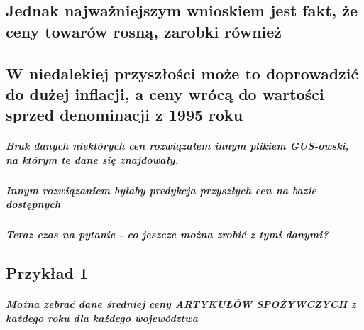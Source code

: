 \documentclass[11pt]{article}
\begin{document}
    \hypertarget{jednak-najwaux17cniejszym-wnioskiem-jest-fakt-ux17ce-ceny-towaruxf3w-rosnux105-zarobki-ruxf3wnieux17c}{%
\subsection{Jednak najważniejszym wnioskiem jest fakt, że ceny towarów
rosną, zarobki
również}\label{jednak-najwaux17cniejszym-wnioskiem-jest-fakt-ux17ce-ceny-towaruxf3w-rosnux105-zarobki-ruxf3wnieux17c}}

\hypertarget{w-niedalekiej-przyszux142oux15bci-moux17ce-to-doprowadziux107-do-duux17cej-inflacji-a-ceny-wruxf3cux105-do-wartoux15bci-sprzed-denominacji-z-1995-roku}{%
\subsection{W niedalekiej przyszłości może to doprowadzić do dużej
inflacji, a ceny wrócą do wartości sprzed denominacji z 1995
roku}\label{w-niedalekiej-przyszux142oux15bci-moux17ce-to-doprowadziux107-do-duux17cej-inflacji-a-ceny-wruxf3cux105-do-wartoux15bci-sprzed-denominacji-z-1995-roku}}

    \hypertarget{brak-danych-niektuxf3rych-cen-rozwiux105zaux142em-innym-plikiem-gus-owski-na-ktuxf3rym-te-dane-siux119-znajdowaux142y.}{%
\subparagraph{Brak danych niektórych cen rozwiązałem innym plikiem
GUS-owski, na którym te dane się
znajdowały.}\label{brak-danych-niektuxf3rych-cen-rozwiux105zaux142em-innym-plikiem-gus-owski-na-ktuxf3rym-te-dane-siux119-znajdowaux142y.}}

\hypertarget{innym-rozwiux105zaniem-byux142aby-predykcja-przyszux142ych-cen-na-bazie-dostux119pnych}{%
\subparagraph{Innym rozwiązaniem byłaby predykcja przyszłych cen na
bazie
dostępnych}\label{innym-rozwiux105zaniem-byux142aby-predykcja-przyszux142ych-cen-na-bazie-dostux119pnych}}

    \hypertarget{teraz-czas-na-pytanie---co-jeszcze-moux17cna-zrobiux107-z-tymi-danymi}{%
\subparagraph{Teraz czas na pytanie - co jeszcze można zrobić z tymi
danymi?}\label{teraz-czas-na-pytanie---co-jeszcze-moux17cna-zrobiux107-z-tymi-danymi}}

    \hypertarget{przykux142ad-1}{%
\subsection{Przykład 1}\label{przykux142ad-1}}

    \hypertarget{moux17cna-zebraux107-dane-ux15bredniej-ceny-artykuux142uxf3w-spoux17cywczych-z-kaux17cdego-roku-dla-kaux17cdego-wojewuxf3dztwa}{%
\subparagraph{Można zebrać dane średniej ceny ARTYKUŁÓW SPOŻYWCZYCH z
każdego roku dla każdego
województwa}\label{moux17cna-zebraux107-dane-ux15bredniej-ceny-artykuux142uxf3w-spoux17cywczych-z-kaux17cdego-roku-dla-kaux17cdego-wojewuxf3dztwa}}
\end{document}
